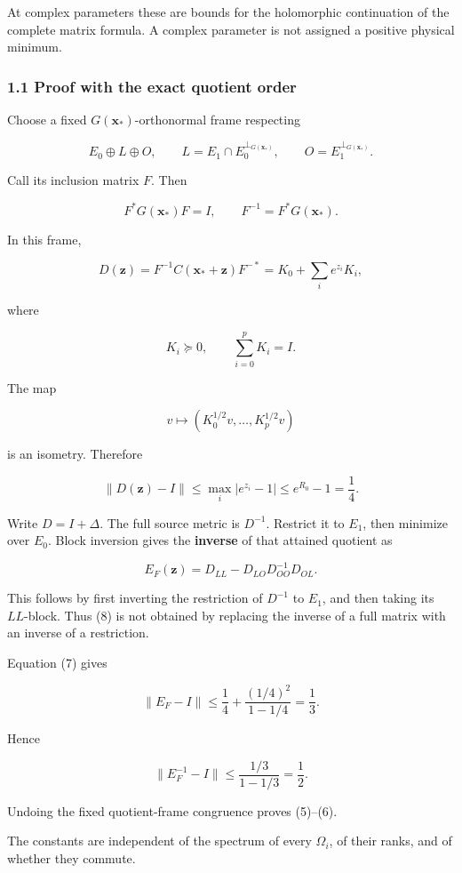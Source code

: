 \documentclass[11pt]{article}
\begin{document}
At complex parameters these are bounds for the holomorphic continuation of the complete matrix formula. A complex parameter is not assigned a positive physical minimum.

\subsubsection{1.1 Proof with the exact quotient order}\label{proof-with-the-exact-quotient-order}

Choose a fixed \(G(\mathbf x_*)\)-orthonormal frame respecting

\[
E_0\oplus L\oplus O,
\qquad
L=E_1\cap E_0^{\perp_{G(\mathbf x_*)}},
\qquad
O=E_1^{\perp_{G(\mathbf x_*)}}.
\]

Call its inclusion matrix \(F\). Then

\[
F^*G(\mathbf x_*)F=I,
\qquad
F^{-1}=F^*G(\mathbf x_*).
\]

In this frame,

\[
D(\mathbf z)
=
F^{-1}C(\mathbf x_*+\mathbf z)F^{-*}
=
K_0+\sum_i e^{z_i}K_i,
\]

where

\[
K_i\succeq0,\qquad \sum_{i=0}^pK_i=I.
\]

The map

\[
v\longmapsto(K_0^{1/2}v,\ldots,K_p^{1/2}v)
\]

is an isometry. Therefore

\[
\left\|D(\mathbf z)-I\right\|
\le
\max_i|e^{z_i}-1|
\le e^{R_0}-1=\frac14.
\tag{7}
\]

Write \(D=I+\Delta\). The full source metric is \(D^{-1}\). Restrict it to \(E_1\), then minimize over \(E_0\). Block inversion gives the \textbf{inverse} of that attained quotient as

\[
\boxed{
E_F(\mathbf z)
=
D_{LL}
-D_{LO}D_{OO}^{-1}D_{OL}.
}
\tag{8}
\]

This follows by first inverting the restriction of \(D^{-1}\) to \(E_1\), and then taking its \(LL\)-block. Thus (8) is not obtained by replacing the inverse of a full matrix with an inverse of a restriction.

Equation (7) gives

\[
\|E_F-I\|
\le
\frac14+\frac{(1/4)^2}{1-1/4}
=\frac13.
\]

Hence

\[
\|E_F^{-1}-I\|\le\frac{1/3}{1-1/3}=\frac12.
\]

Undoing the fixed quotient-frame congruence proves (5)--(6).

The constants are independent of the spectrum of every \(\Omega_i\), of their ranks, and of whether they commute.
\end{document}

